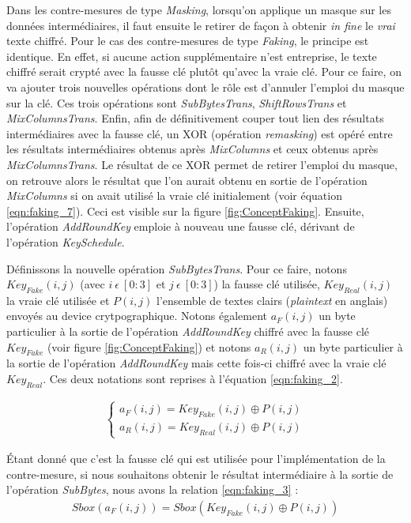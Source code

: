 \documentclass[oneside]{book}
\begin{document}
Dans les contre-mesures de type \textit{Masking}, lorsqu'on applique un masque sur les données intermédiaires, il faut ensuite le retirer de façon à obtenir \textit{in fine} le \textit{vrai} texte chiffré. Pour le cas des contre-mesures de type \textit{Faking}, le principe est identique. En effet, si aucune action supplémentaire n'est entreprise, le texte chiffré serait crypté avec la fausse clé plutôt qu'avec la vraie clé. Pour ce faire, on va ajouter trois nouvelles opérations dont le rôle est d'annuler l'emploi du masque sur la clé. Ces trois opérations sont \textit{SubBytesTrans}, \textit{ShiftRowsTrans} et \textit{MixColumnsTrans}. Enfin, afin de définitivement couper tout lien des résultats intermédiaires avec la fausse clé, un XOR (opération \textit{remasking}) est opéré entre les résultats intermédiaires obtenus après \textit{MixColumns} et ceux obtenus après \textit{MixColumnsTrans}. Le résultat de ce XOR permet de retirer l'emploi du masque, on retrouve alors le résultat que l'on aurait obtenu en sortie de l'opération \textit{MixColumns} si on avait utilisé la vraie clé initialement (voir équation \ref{eqn:faking_7}). Ceci est visible sur la figure \ref{fig:ConceptFaking}. Ensuite, l'opération \textit{AddRoundKey} emploie à nouveau une fausse clé, dérivant de l'opération \textit{KeySchedule}.

Définissons la nouvelle opération \textit{SubBytesTrans}. Pour ce faire, notons $Key_{Fake}(i,j)$ (avec $i \ \epsilon \ [0:3]$ et $j \ \epsilon \ [0:3]$) la fausse clé utilisée, $Key_{Real}(i,j)$ la vraie clé utilisée et $P(i,j)$ l'ensemble de textes clairs (\textit{plaintext} en anglais) envoyés au device crytpographique. Notons également $a_{F}(i,j)$ un byte particulier à la sortie de l'opération \textit{AddRoundKey} chiffré avec la fausse clé $Key_{Fake}$ (voir figure \ref{fig:ConceptFaking}) et notons $a_{R}(i,j)$ un byte particulier à la sortie de l'opération \textit{AddRoundKey} mais cette fois-ci chiffré avec la vraie clé $Key_{Real}$. Ces deux notations sont reprises à l'équation \ref{eqn:faking_2}.

\begin{gather}
	\left\{\begin{matrix}
	a_{F}(i,j) = Key_{Fake}(i,j) \oplus P(i,j) \\ 
	a_{R}(i,j) = Key_{Real}(i,j) \oplus P(i,j)
	\end{matrix}\right.\label{eqn:faking_2}
\end{gather}

\hspace{-0.5cm}Étant donné que c'est la fausse clé qui est utilisée pour l'implémentation de la contre-mesure, si nous souhaitons obtenir le résultat intermédiaire à la sortie de l'opération \textit{SubBytes}, nous avons la relation \ref{eqn:faking_3} :
\begin{gather}
	Sbox(a_{F}(i,j)) = Sbox(Key_{Fake}(i,j) \oplus P(i,j))\label{eqn:faking_3}
\end{gather}
\end{document}
